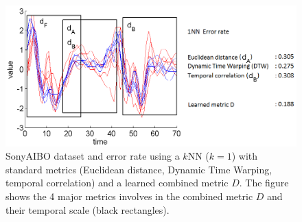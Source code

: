 \begin{figure}[h!]
	\centering
	\includegraphics[width=1\linewidth]{images/SonyAIBO3}
	\caption{SonyAIBO dataset and error rate using a $k$NN ($k=1$) with standard metrics (Euclidean distance, Dynamic Time Warping, temporal correlation) and a learned combined metric $D$. The figure shows the 4 major metrics involves in the combined metric $D$ and their temporal scale (black rectangles).}
	\label{fig:SonyAIBO}
\end{figure}


